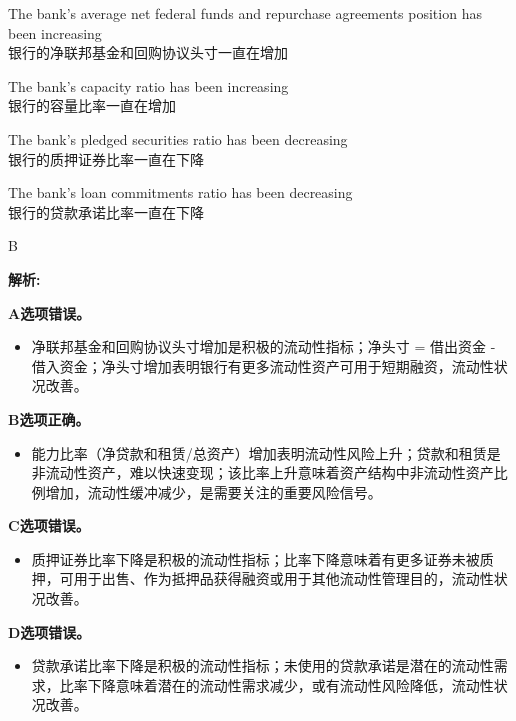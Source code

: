 \documentclass{article}
\newenvironment{explanation}
{\textbf{解析:}\par}
{\par}
\begin{document}
\begin{choices}
    \item The bank's average net federal funds and repurchase agreements position has been increasing\\
    银行的净联邦基金和回购协议头寸一直在增加
    \item The bank's capacity ratio has been increasing\\
    银行的容量比率一直在增加
    \item The bank's pledged securities ratio has been decreasing\\
    银行的质押证券比率一直在下降
    \item The bank's loan commitments ratio has been decreasing\\
    银行的贷款承诺比率一直在下降
\end{choices}

\begin{correctanswer}
    B
\end{correctanswer}

\begin{explanation}
    \textbf{A选项错误。}
    \begin{itemize}
        \item 净联邦基金和回购协议头寸增加是积极的流动性指标；净头寸 = 借出资金 - 借入资金；净头寸增加表明银行有更多流动性资产可用于短期融资，流动性状况改善。
    \end{itemize}

    \textbf{B选项正确。}
    \begin{itemize}
        \item 能力比率（净贷款和租赁/总资产）增加表明流动性风险上升；贷款和租赁是非流动性资产，难以快速变现；该比率上升意味着资产结构中非流动性资产比例增加，流动性缓冲减少，是需要关注的重要风险信号。
    \end{itemize}

    \textbf{C选项错误。}
    \begin{itemize}
        \item 质押证券比率下降是积极的流动性指标；比率下降意味着有更多证券未被质押，可用于出售、作为抵押品获得融资或用于其他流动性管理目的，流动性状况改善。
    \end{itemize}

    \textbf{D选项错误。}
    \begin{itemize}
        \item 贷款承诺比率下降是积极的流动性指标；未使用的贷款承诺是潜在的流动性需求，比率下降意味着潜在的流动性需求减少，或有流动性风险降低，流动性状况改善。
    \end{itemize}
\end{explanation}
\end{document}
